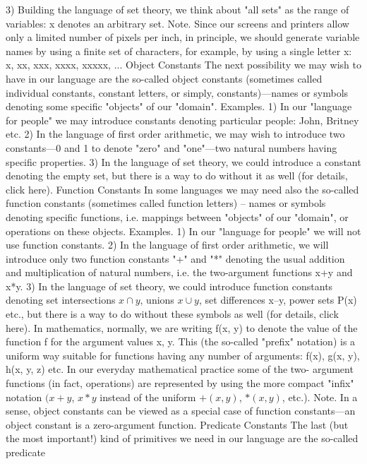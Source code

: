 3) Building the language of set theory, we think about "all sets" as the range of variables: x denotes an arbitrary set.
Note. Since our screens and printers allow only a limited number of pixels per inch, in principle, we
should generate variable names by using a finite set of characters, for example, by using a single letter x:
x, xx, xxx, xxxx, xxxxx, ...
Object Constants
The next possibility we may wish to have in our language are the so-called object constants (sometimes
called individual constants, constant letters, or simply, constants)---names or symbols denoting some
specific "objects" of our "domain".
Examples. 1) In our "language for people" we may introduce constants denoting particular people: John, Britney etc.
2) In the language of first order arithmetic, we may wish to introduce two constants---0 and 1 to denote "zero" and "one"---two
natural numbers having specific properties.
3) In the language of set theory, we could introduce a constant denoting the empty set, but there is a way to do without it as
well (for details, click here).
Function Constants
In some languages we may need also the so-called function constants (sometimes called function letters)
– names or symbols denoting specific functions, i.e. mappings between "objects" of our "domain", or
operations on these objects.
Examples. 1) In our "language for people" we will not use function constants.
2) In the language of first order arithmetic, we will introduce only two function constants "+" and "*" denoting the usual
addition and multiplication of natural numbers, i.e. the two-argument functions x+y and x*y.
3) In the language of set theory, we could introduce function constants denoting set intersections \(x\cap y\), unions \(x\cup y\), set
differences x–y, power sets P(x) etc., but there is a way to do without these symbols as well (for details, click here).
In mathematics, normally, we are writing f(x, y) to denote the value of the function f for the argument
values x, y. This (the so-called "prefix" notation) is a uniform way suitable for functions having any
number of arguments: f(x), g(x, y), h(x, y, z) etc. In our everyday mathematical practice some of the two-
argument functions (in fact, operations) are represented by using the more compact "infix" notation \((x+y\),
\(x*y\) instead of the uniform \(+(x, y)\), \(*(x, y)\), etc.).
Note. In a sense, object constants can be viewed as a special case of function constants---an object
constant is a zero-argument function.
Predicate Constants
The last (but the most important!) kind of primitives we need in our language are the so-called predicate
